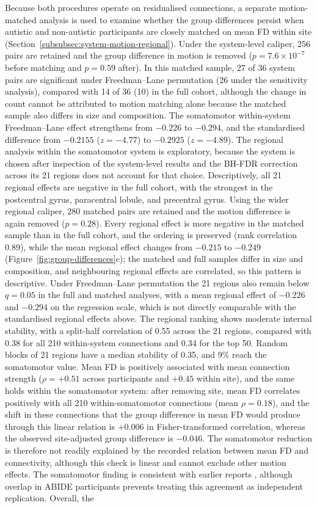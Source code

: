 Because both procedures operate on residualised connections, a separate motion-matched analysis is used to examine whether the group differences persist when autistic and non-autistic participants are closely matched on mean FD within site (Section~\ref{subsubsec:system-motion-regional}). Under the system-level caliper, 256 pairs are retained and the group difference in motion is removed ($p=7.6\times10^{-7}$ before matching and $p=0.59$ after). In this matched sample, 27 of 36 system pairs are significant under Freedman--Lane permutation (26 under the sensitivity analysis), compared with 14 of 36 (10) in the full cohort, although the change in count cannot be attributed to motion matching alone because the matched sample also differs in size and composition. The somatomotor within-system Freedman--Lane effect strengthens from $-0.226$ to $-0.294$, and the standardised difference from $-0.2155$ ($z=-4.77$) to $-0.2925$ ($z=-4.89$). The regional analysis within the somatomotor system is exploratory, because the system is chosen after inspection of the system-level results and the BH-FDR correction across its 21 regions does not account for that choice. Descriptively, all 21 regional effects are negative in the full cohort, with the strongest in the postcentral gyrus, paracentral lobule, and precentral gyrus. Using the wider regional caliper, 280 matched pairs are retained and the motion difference is again removed ($p=0.28$). Every regional effect is more negative in the matched sample than in the full cohort, and the ordering is preserved (rank correlation 0.89), while the mean regional effect changes from $-0.215$ to $-0.249$ (Figure~\ref{fig:group-differences}c); the matched and full samples differ in size and composition, and neighbouring regional effects are correlated, so this pattern is descriptive. Under Freedman--Lane permutation the 21 regions also remain below $q=0.05$ in the full and matched analyses, with a mean regional effect of $-0.226$ and $-0.294$ on the regression scale, which is not directly comparable with the standardised regional effects above. The regional ranking shows moderate internal stability, with a split-half correlation of 0.55 across the 21 regions, compared with 0.38 for all 210 within-system connections and 0.34 for the top 50. Random blocks of 21 regions have a median stability of 0.35, and 9\% reach the somatomotor value. Mean FD is positively associated with mean connection strength ($\rho=+0.51$ across participants and $+0.45$ within site), and the same holds within the somatomotor system: after removing site, mean FD correlates positively with all 210 within-somatomotor connections (mean $\rho=0.18$), and the shift in these connections that the group difference in mean FD would produce through this linear relation is $+0.006$ in Fisher-transformed correlation, whereas the observed site-adjusted group difference is $-0.046$. The somatomotor reduction is therefore not readily explained by the recorded relation between mean FD and connectivity, although this check is linear and cannot exclude other motion effects. The somatomotor finding is consistent with earlier reports \citep{Chenetal2015,Holigaetal2019,Ilioskaetal2023}, although overlap in ABIDE participants prevents treating this agreement as independent replication. Overall, the 